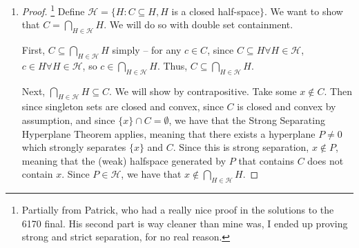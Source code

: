 \documentclass[10pt]{article}
\begin{document}
\maketitle

\begin{enumerate}
	\item \begin{proof}\footnote{Partially from Patrick, who had a really nice proof in the solutions to the 6170 final. His second part is way cleaner than mine was, I ended up proving strong and strict separation, for no real reason.} Define $\mathcal{H} = \{ H : C \subseteq H, H$ is a closed half-space$\}$. We want to show that $C = \bigcap_{H \in \mathcal{H}}H$. We will do so with double set containment. 
	
	First, $C \subseteq \bigcap_{H \in \mathcal{H}}H$ simply -- for any $c \in C$, since $C \subseteq H \forall H \in \mathcal{H}$, $c \in H \forall H \in \mathcal{H}$, so $c \in \bigcap_{H \in \mathcal{H}}H$. Thus, $C \subseteq \bigcap_{H \in \mathcal{H}}H$.
	
	Next, $\bigcap_{H \in \mathcal{H}}H \subseteq C$. We will show by contrapositive. Take some $x \not\in C$. Then since singleton sets are closed and convex, since $C$ is closed and convex by assumption, and since $\{x\} \cap C = \emptyset$, we have that the Strong Separating Hyperplane Theorem applies, meaning that there exists a hyperplane $P \ne 0$ which strongly separates $\{x\}$ and $C$. Since this is strong separation, $x \not\in P$, meaning that the (weak) halfspace generated by $P$ that contains $C$ does not contain $x$. Since $P \in \mathcal{H}$, we have that $x \not\in \bigcap_{H \in \mathcal{H}}H$.
	

\end{proof}
\end{enumerate}
\end{document}
